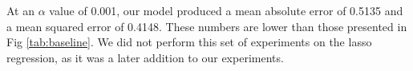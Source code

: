 At an $\alpha$ value of 0.001, our model produced a mean absolute error of 0.5135
and a mean squared error of 0.4148. These numbers are lower than those presented
in Fig \ref{tab:baseline}. We did not perform this set of experiments on the lasso regression,
as it was a later addition to our experiments.







